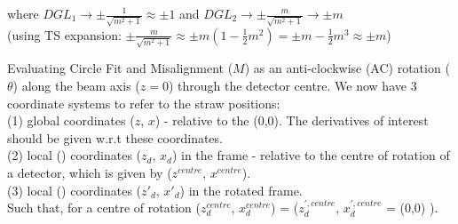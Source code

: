 \documentclass[a4paper,11pt]{article}
\begin{document}
 where $DGL_1 \rightarrow \pm \frac{1}{\sqrt{m^2+1}} \approx \pm 1 $ and $DGL_2 \rightarrow \pm \frac{m}{\sqrt{m^2+1}} \rightarrow \pm m$ \\
(using TS expansion: $\pm \frac{m}{\sqrt{m^2+1}} \approx \pm m (1-\frac{1}{2}m^2) = \pm m - \frac{1}{2}m^3 \approx \pm m  $)

\clearpage

Evaluating Circle Fit and Misalignment ($M$) as an anti-clockwise (AC) rotation ($\theta$) along the beam axis ($z=0$) through the detector centre. We now have 3 coordinate systems to refer to the straw positions: \\
(1) global coordinates ($z$, $x$) - relative to the  (0,0). The derivatives of interest should be given w.r.t these coordinates. \\ 
(2) local () coordinates ($z_d$, $x_d$) in the  frame - relative to the centre of rotation of a detector, which is given by ($z^{centre}$, $x^{centre}$). \\ 
(3) local () coordinates ($z'_{d}$, $x'_d$) in the rotated frame. \\
Such that, for a centre of rotation ($z^{centre}_d$, $x^{centre}_d$) = ($z^{',centre}_{d}$, $x^{',centre}_d$ = (0,0) ). \\ 
\end{document}

